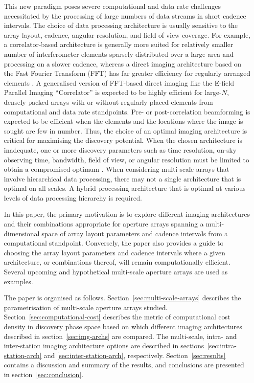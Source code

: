 \documentclass[
  journal=pasa,
  manuscript=article-type,
  year=2020,
  volume=37,
]{cup-journal}
\begin{document}
This new paradigm poses severe computational and data rate challenges necessitated by the processing of large numbers of data streams in short cadence intervals. The choice of data processing architecture is usually sensitive to the array layout, cadence, angular resolution, and field of view coverage. For example, a correlator-based architecture is generally more suited for relatively smaller number of interferometer elements sparsely distributed over a large area and processing on a slower cadence, whereas a direct imaging architecture based on the Fast Fourier Transform (FFT) has far greater efficiency for regularly arranged elements \citep{Daishido+1991,Otobe+1994,Tegmark+2009,Tegmark+2010,Foster+2014,Masui+2019}. A generalised version of FFT-based direct imaging like the E-field Parallel Imaging ``Correlator'' \citep[EPIC;][]{Thyagarajan+2017,Thyagarajan+2019,Krishnan+2023} is expected to be highly efficient for large-$N$, densely packed arrays with or without regularly placed elements from computational and data rate standpoints. Pre- or post-correlation beamforming is expected to be efficient when the elements and the locations where the image is sought are few in number. Thus, the choice of an optimal imaging architecture is critical for maximising the discovery potential. When the chosen architecture is inadequate, one or more discovery parameters such as time resolution, on-sky observing time, bandwidth, field of view, or angular resolution must be limited to obtain a compromised optimum \citep[for example,][]{Price2024}. When considering multi-scale arrays that involve hierarchical data processing, there may not a single architecture that is optimal on all scales. A hybrid processing architecture that is optimal at various levels of data processing hierarchy is required. 

In this paper, the primary motivation is to explore different imaging architectures and their combinations appropriate for aperture arrays spanning a multi-dimensional space of array layout parameters and cadence intervals from a computational standpoint. Conversely, the paper also provides a guide to choosing the array layout parameters and cadence intervals where a given architecture, or combinations thereof, will remain computationally efficient. Several upcoming and hypothetical multi-scale aperture arrays are used as examples. 

The paper is organised as follows.
Section~\ref{sec:multi-scale-arrays} describes the parametrisation of multi-scale aperture arrays studied. Section~\ref{sec:computational-cost} describes the metric of computational cost density in discovery phase space based on which different imaging architectures described in section~\ref{sec:img-archs} are compared. The multi-scale, intra- and inter-station imaging architecture options are described in sections~\ref{sec:intra-station-arch} and \ref{sec:inter-station-arch}, respectively. Section~\ref{sec:results} contains a discussion and summary of the results, and conclusions are presented in section~\ref{sec:conclusion}. 
\end{document}
